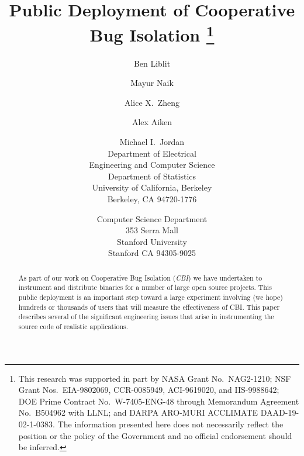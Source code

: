 \documentclass[10pt,twocolumn]{article}
\newcommand{\termdef}[1]{\emph{#1}}
\begin{document}
\title{Public Deployment of Cooperative Bug Isolation
  \thanks{This research was supported in part by NASA Grant No.\ 
    NAG2-1210; NSF Grant Nos.\ EIA-9802069, CCR-0085949, ACI-9619020,
    and IIS-9988642; DOE Prime Contract No.\ W-7405-ENG-48 through
    Memorandum Agreement No.\ B504962 with LLNL; and DARPA ARO-MURI
    ACCLIMATE DAAD-19-02-1-0383.  The information presented here does
    not necessarily reflect the position or the policy of the
    Government and no official endorsement should be inferred.}}

\author{%
  Ben Liblit \eecs \\  \and
  Mayur Naik \stan \\  \and
  Alice X.\ Zheng \eecs \\  \and
  Alex Aiken \stan \\  \and
  Michael I.\ Jordan \both \\ 
  \aupar
  \eecs Department of Electrical \\ Engineering and Computer Science \\
  \stat Department of Statistics \\
  University of California, Berkeley \\
  Berkeley, CA 94720-1776
  \and
  \stan Computer Science Department \\
  353 Serra Mall \\
  Stanford University \\
  Stanford CA 94305-9025
}

\maketitle

\thispagestyle{empty}

\begin{abstract}
  As part of our work on Cooperative Bug Isolation (\termdef{CBI}) we
  have undertaken to instrument and distribute binaries for a number
  of large open source projects.  This public deployment is an
  important step toward a large experiment involving (we hope)
  hundreds or thousands of users that will measure the effectiveness
  of CBI\@.  This paper describes several of the significant
  engineering issues that arise in instrumenting the source code of
  realistic applications.
\end{abstract}
\end{document}
